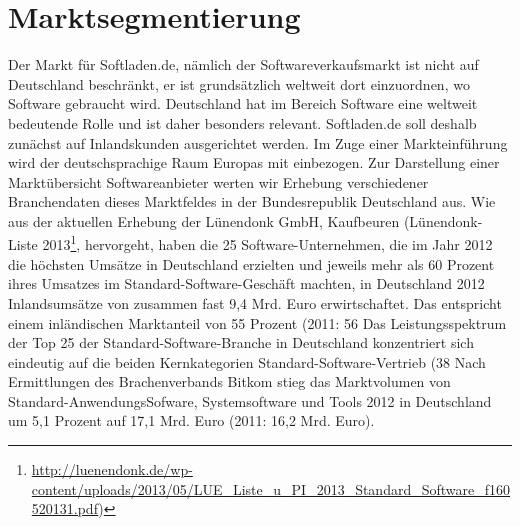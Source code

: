\section{Marktsegmentierung}
Der Markt für Softladen.de, nämlich der Softwareverkaufsmarkt ist nicht auf Deutschland beschränkt, er ist grundsätzlich weltweit dort einzuordnen, wo Software gebraucht wird. Deutschland hat im Bereich Software eine weltweit bedeutende Rolle und ist daher besonders relevant. Softladen.de soll deshalb zunächst auf Inlandskunden ausgerichtet werden. Im Zuge einer Markteinführung wird der deutschsprachige Raum Europas mit einbezogen. Zur Darstellung einer Marktübersicht Softwareanbieter werten wir Erhebung verschiedener Branchendaten dieses Marktfeldes in der Bundesrepublik Deutschland aus. Wie aus der aktuellen Erhebung der Lünendonk GmbH, Kaufbeuren (Lünendonk\textsuperscript{\textregistered}-Liste 2013\footnote[1]{\url{http://luenendonk.de/wp-content/uploads/2013/05/LUE_Liste_u_PI_2013_Standard_Software_f160520131.pdf})}, hervorgeht, haben die 25 Software-Unternehmen, die im Jahr 2012 die höchsten Umsätze in Deutschland erzielten und jeweils mehr als 60 Prozent ihres Umsatzes im Standard-Software-Geschäft machten, in Deutschland 2012 Inlandsumsätze von zusammen fast 9,4 Mrd. Euro erwirtschaftet. Das entspricht einem inländischen Marktanteil von 55 Prozent (2011: 56%
Das Leistungsspektrum der Top 25 der Standard-Software-Branche in Deutschland konzentriert sich eindeutig auf die beiden Kernkategorien Standard-Software-Vertrieb (38%
Nach Ermittlungen des Brachenverbands Bitkom stieg das Marktvolumen von Standard-AnwendungsSofware, Systemsoftware und Tools 2012 in Deutschland um 5,1 Prozent auf 17,1 Mrd. Euro (2011: 16,2 Mrd. Euro).

